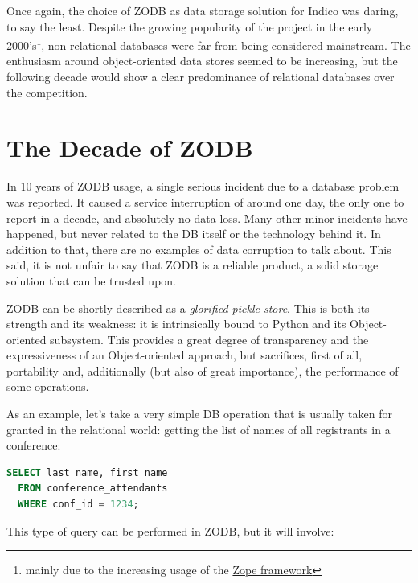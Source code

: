 \par Once again, the choice of \textsc{ZODB} as data storage solution for Indico was daring, to say the least. Despite the growing popularity of the project in the early 2000's\footnote{mainly due to the increasing usage of the \href{http://zope2.zope.org/}{Zope framework}}, non-relational databases were far from being considered mainstream. The enthusiasm around object-oriented data stores seemed to be increasing, but the following decade would show a clear predominance of relational databases over the competition.

\section{The Decade of ZODB} 

\par In 10 years of \textsc{ZODB} usage, a single serious incident due to a database problem was reported. It caused a service interruption of around one day, the only one to report in a decade, and absolutely no data loss. Many other minor incidents have happened, but never related to the DB itself or the technology behind it. In addition to that, there are no examples of data corruption to talk about. This said, it is not unfair to say that \textsc{ZODB} is a reliable product, a solid storage solution that can be trusted upon.

\textsc{ZODB} can be shortly described as a \textit{glorified pickle store}. This is both its strength and its weakness: it is intrinsically bound to Python and its Object-oriented subsystem. This provides a great degree of transparency and the expressiveness of an Object-oriented approach, but sacrifices, first of all, portability and, additionally (but also of great importance), the performance of some operations.

As an example, let's take a very simple DB operation that is usually taken for granted in the relational world: getting the list of names of all registrants in a conference:

\begin{lstlisting}[language=SQL]
  SELECT last_name, first_name
  FROM conference_attendants
  WHERE conf_id = 1234;
\end{lstlisting}

This type of query can be performed in \textsc{ZODB}, but it will involve:

